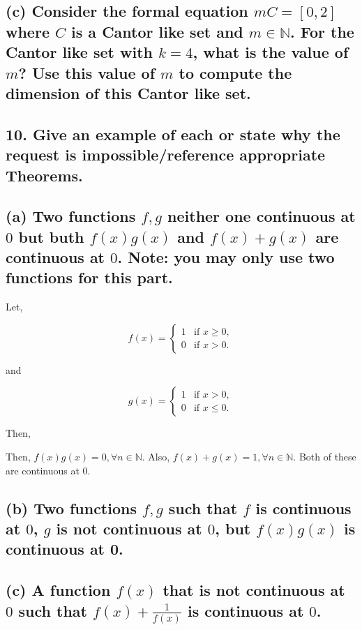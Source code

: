 \documentclass{article}
\begin{document}
\subsection*{(c) Consider the formal equation $mC = [0,2]$ where $C$ is a Cantor like set and $m \in \mathbb{N}$. For the Cantor like set with $k = 4$, what is the 
value of $m$? Use this value of $m$ to compute the dimension of this Cantor like set.}

\subsection*{10. Give an example of each or state why the request is impossible/reference appropriate Theorems.}

\subsection*{(a) Two functions $f, g$ neither one continuous at $0$ but buth $f(x)g(x)$ and $f(x) + g(x)$ are continuous at $0$. Note: you may only use two functions for this part.}

Let,

\begin{equation}
    f(x) =
        \begin{cases}
            1 & \text{if } x \ge 0, \\
            0 & \text{if } x > 0.
        \end{cases}
    \end{equation}

and

\begin{equation}
    g(x) =
        \begin{cases}
            1 & \text{if } x > 0, \\
            0 & \text{if } x \le 0.
        \end{cases}
    \end{equation}

Then, 

Then, $f(x)g(x) = 0, \forall n \in \mathbb{N}$. Also, $f(x) + g(x) = 1, \forall n \in \mathbb{N}$. Both of these are continuous at 0.

\subsection*{(b) Two functions $f, g$ such that $f$ is continuous at $0$, $g$ is not continuous at $0$, but $f(x)g(x)$ is continuous at 0.}

\subsection*{(c) A function $f(x)$ that is not continuous at $0$ such that $f(x) + \frac{1}{f(x)}$ is continuous at $0$.}
\end{document}
